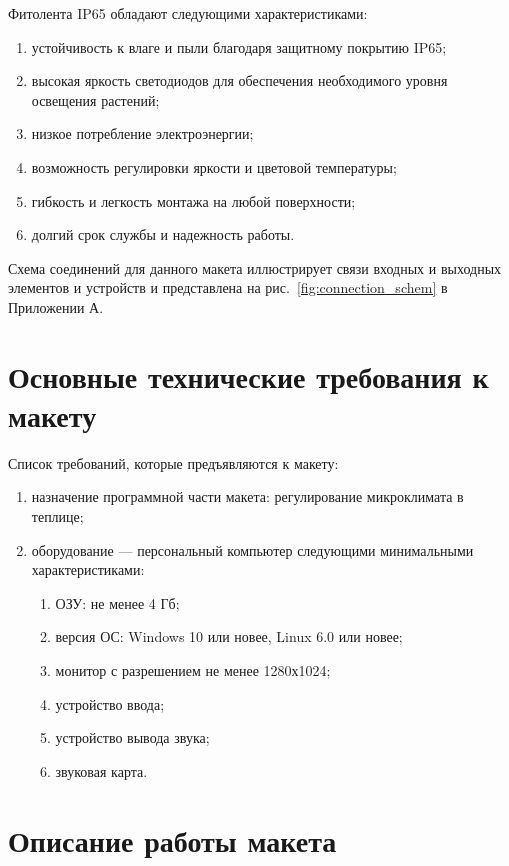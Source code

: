 \begin{enumerate}
    Фитолента IP65 обладают следующими характеристиками:
    
    \begin{enumerate}
        \item устойчивость к влаге и пыли благодаря защитному покрытию IP65;
        \item высокая яркость светодиодов для обеспечения необходимого уровня освещения растений;
        \item низкое потребление электроэнергии;
        \item возможность регулировки яркости и цветовой температуры;
        \item гибкость и легкость монтажа на любой поверхности;
        \item долгий срок службы и надежность работы.
    \end{enumerate}
\end{enumerate}

Схема соединений для данного макета иллюстрирует связи входных и выходных элементов и устройств и представлена на рис.~\ref{fig:connection_schem} в Приложении А.

\section{Основные технические требования к макету}

Список требований, которые предъявляются к макету:
\begin{enumerate}
    \item назначение программной части макета: регулирование микроклимата в теплице;
    \item оборудование --- персональный компьютер следующими минимальными характеристиками:
    \begin{enumerate}
        \item ОЗУ: не менее 4 Гб;
        \item версия ОС: Windows 10 или новее, Linux 6.0 или новее;
        \item монитор с разрешением не менее 1280х1024;
        \item устройство ввода;
        \item устройство вывода звука;
        \item звуковая карта.
    \end{enumerate}
\end{enumerate}

\section{Описание работы макета}

